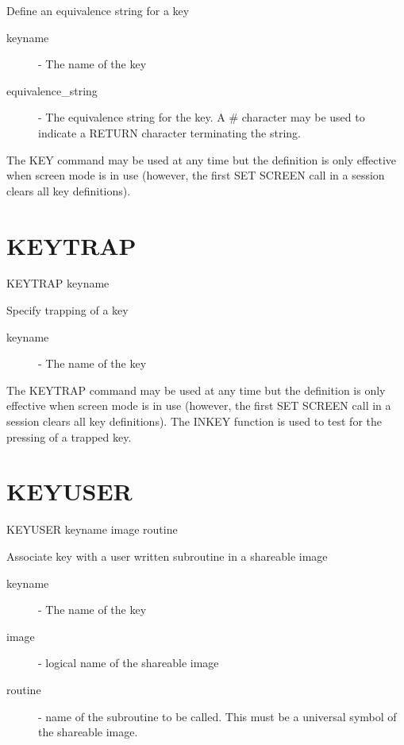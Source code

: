 \documentclass[twoside,11pt]{report}
\newcommand{\xlabel}[1]{}
\begin{document}
 Define an equivalence string for a key

\begin{description}

\item[keyname] -  The name of the key

\item[equivalence\_string]  -  The equivalence string for the key. A \#
              character may be used to indicate a RETURN character
              terminating the string.

\end{description}

The KEY command may be used at any time but the definition is only
effective when screen mode is in use (however, the first SET SCREEN call
in a session clears all key definitions).

\section{\xlabel{KEYTRAP}KEYTRAP\label{KEYTRAP}}

    KEYTRAP  \hspace{.5cm} keyname

 Specify trapping of a key

\begin{description}

\item[keyname] -  The name of the key

\end{description}

The KEYTRAP command may be used at any time but the definition is only
effective when screen mode is in use (however, the first SET SCREEN call
in a session clears all key definitions). The INKEY function is used to test
for the pressing of a trapped key.

\section{\xlabel{KEYUSER}KEYUSER\label{KEYUSER}}

    KEYUSER  \hspace{.5cm} keyname  \hspace{.5cm} image \hspace{.5cm} routine

 Associate key with a user written subroutine in a shareable image

\begin{description}

\item[keyname] -  The name of the key

\item[image] - logical name of the shareable image

\item[routine] - name of the subroutine to be called. This must be a universal
symbol of the shareable image.

\end{description}
\end{document}
